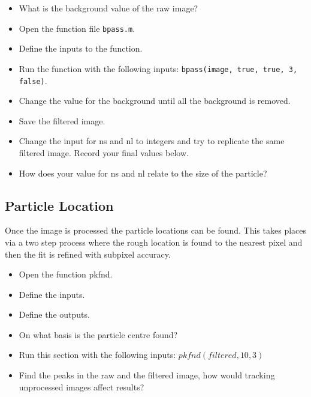 \documentclass[12pt,a4paper,twoside]{article}
\begin{document}
\begin{itemize}
    \item What is the background value of the raw image?
    \item Open the function file \lstinline{bpass.m}.
    \item Define the inputs to the function.
    \vspace{1cm}

    \item Run the function with the following inputs: \lstinline{bpass(image, true, true, 3, false)}.
    \item Change the value for the background until all the background is removed.
    \item Save the filtered image.
    \item Change the input for ns and nl to integers and try to replicate the same filtered image. Record your final values below.
        \vspace{1cm}
         \item How does your value for ns and nl relate to the size of the particle?
        \vspace{1cm}   
\end{itemize}



\subsection{Particle Location}

Once the image is processed the particle locations can be found. This takes places via a two step process where the rough location is found to the nearest pixel and then the fit is refined with subpixel accuracy. 

\begin{itemize}
    \item Open the function pkfnd.
    \item Define the inputs.
        \vspace{1cm}
    \item Define the outputs.
        \vspace{1cm}
    \item On what basis is the particle centre found?
        \vspace{1cm}
      \item Run this section with the following inputs: $pkfnd(filtered,10,3)$
        \vspace{1cm}   
    \item Find the peaks in the raw and the filtered image, how would tracking unprocessed images affect results?
        \vspace{1cm}
\end{itemize}
\end{document}

